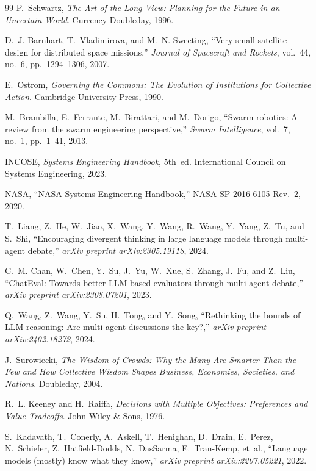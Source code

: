 \documentclass[11pt,a4paper]{article}
\begin{document}
\begin{thebibliography}{99}
P.~Schwartz, \emph{The Art of the Long View: Planning for the Future in an Uncertain World}. Currency Doubleday, 1996.

D.~J. Barnhart, T.~Vladimirova, and M.~N. Sweeting, ``Very-small-satellite design for distributed space missions,'' \emph{Journal of Spacecraft and Rockets}, vol.~44, no.~6, pp.~1294--1306, 2007.

E.~Ostrom, \emph{Governing the Commons: The Evolution of Institutions for Collective Action}. Cambridge University Press, 1990.

M.~Brambilla, E.~Ferrante, M.~Birattari, and M.~Dorigo, ``Swarm robotics: A review from the swarm engineering perspective,'' \emph{Swarm Intelligence}, vol.~7, no.~1, pp.~1--41, 2013.

INCOSE, \emph{Systems Engineering Handbook}, 5th~ed. International Council on Systems Engineering, 2023.

NASA, ``NASA Systems Engineering Handbook,'' NASA SP-2016-6105 Rev.~2, 2020.

T.~Liang, Z.~He, W.~Jiao, X.~Wang, Y.~Wang, R.~Wang, Y.~Yang, Z.~Tu, and S.~Shi, ``Encouraging divergent thinking in large language models through multi-agent debate,'' \emph{arXiv preprint arXiv:2305.19118}, 2024.

C.~M. Chan, W.~Chen, Y.~Su, J.~Yu, W.~Xue, S.~Zhang, J.~Fu, and Z.~Liu, ``ChatEval: Towards better LLM-based evaluators through multi-agent debate,'' \emph{arXiv preprint arXiv:2308.07201}, 2023.

Q.~Wang, Z.~Wang, Y.~Su, H.~Tong, and Y.~Song, ``Rethinking the bounds of LLM reasoning: Are multi-agent discussions the key?,'' \emph{arXiv preprint arXiv:2402.18272}, 2024.

J.~Surowiecki, \emph{The Wisdom of Crowds: Why the Many Are Smarter Than the Few and How Collective Wisdom Shapes Business, Economies, Societies, and Nations}. Doubleday, 2004.

R.~L. Keeney and H.~Raiffa, \emph{Decisions with Multiple Objectives: Preferences and Value Tradeoffs}. John Wiley \& Sons, 1976.

S.~Kadavath, T.~Conerly, A.~Askell, T.~Henighan, D.~Drain, E.~Perez, N.~Schiefer, Z.~Hatfield-Dodds, N.~DasSarma, E.~Tran-Kemp, et~al., ``Language models (mostly) know what they know,'' \emph{arXiv preprint arXiv:2207.05221}, 2022.

\end{thebibliography}
\end{document}
